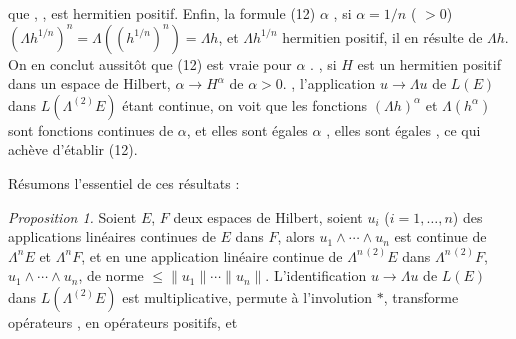 \documentclass[11pt,a4paper]{article}
\begin{document}
 \ill{}    que   ,   , est hermitien positif. Enfin, la formule (12)    $\alpha$  ,     si $\alpha = 1/n$ (  $> 0$)    $(\Lambda h^{1/n})^{n} = \Lambda((h^{1/n})^{n}) = \Lambda h$, et \struck{\ill{}} \ill{} $\Lambda h^{1/n}$ \ill{} hermitien positif, il en résulte       de $\Lambda h$.  On en conclut aussitôt que (12) est vraie pour $\alpha$ .  , si $H$ est un  hermitien positif dans un espace de Hilbert,    $\alpha \to H^{\alpha}$     de $\alpha > 0$. , l'application $u \to \Lambda u$ de $L(E)$ dans $L(\Lambda^{(2)} E)$ étant  continue, on voit que les fonctions $(\Lambda h)^{\alpha}$ et $\Lambda(h^{\alpha})$ sont fonctions continues de $\alpha$, et  elles sont égales  $\alpha$ \ill{} \ill{}  , elles sont égales , ce qui achève d'établir (12).

Résumons l'essentiel de ces résultats :

\emph{Proposition 1.}  Soient $E$, $F$ deux espaces de Hilbert, soient $u_i$ ($i = 1, \ldots, n$) des applications linéaires continues de $E$ dans $F$, alors $u_1 \wedge \cdots \wedge u_n$ est continue     de $\Lambda^{n} E$ et $\Lambda^{n} F$, et      en une application linéaire continue de $\Lambda^{n\,(2)} E$ dans $\Lambda^{n\,(2)} F$, \struck{\ill{}}   $u_1 \wedge \cdots \wedge u_n$,  de norme $\leq \|u_1\| \cdots \|u_n\|$. L'identification $u \to \Lambda u$ de $L(E)$ dans $L(\Lambda^{(2)} E)$ est multiplicative, permute à l'involution $*$, transforme opérateurs , \ill{} \ill{} en opérateurs \ill{} positifs, et
\end{document}
